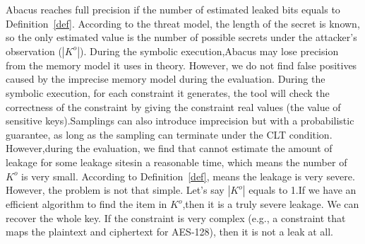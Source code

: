 Abacus reaches full precision if the number of estimated leaked bits 
equals to Definition~\ref{def}. According to the threat model, the 
length of the secret is known, so the only estimated value is the number
 of possible secrets under the attacker's observation ($|K^o|$). 
 During the symbolic execution,Abacus may lose precision from the 
 memory model it uses in theory. However, we do not find false positives 
 caused by the imprecise memory model during the evaluation. 
 During the symbolic execution, for each constraint it generates,
 the tool will check the correctness of the constraint by giving 
 the constraint real values (the value of sensitive keys).Samplings 
 can also introduce imprecision but with a probabilistic guarantee, 
 as long as the sampling can terminate under the CLT condition. 
 However,during the evaluation, we find that \tool{} cannot estimate 
 the amount of leakage for some leakage sitesin a reasonable time, 
 which means the number of $K^o$ is very small. According to Definition~\ref{def}, 
 means the leakage is very severe. However, the problem is not that simple. 
 Let's say $|K^o|$ equals to 1.If we have an efficient algorithm to 
 find the item in $K^o$,then it is a truly severe leakage. 
 We can recover the whole key. If the constraint is very complex
 (e.g., a constraint that maps the plaintext and ciphertext for AES-128), 
 then it is not a leak at all.
